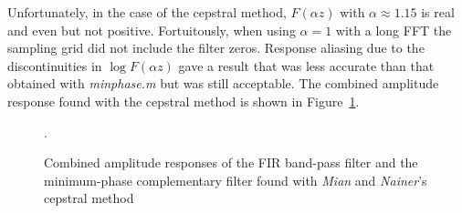 \documentclass[a4paper,twoside,10pt,english]{report}
\begin{document}
Unfortunately, in the case of the cepstral method, $F\left(\alpha z\right)$
with $\alpha \approx 1.15$ is real and even but not positive. Fortuitously, when
using $\alpha=1$ with a long FFT the sampling grid did not include the filter
zeros. Response aliasing due to the discontinuities in
$\log F\left(\alpha z\right)$ gave a result that was less accurate than that
obtained with \emph{minphase.m} but was still acceptable. The combined amplitude
response found with the cepstral method is shown in 
Figure~\ref{fig:minphase-cepstral-combined-response}.

\begin{figure}[!htbp]
\begin{center}
\scalebox{0.7}{}
\caption{Combined amplitude responses of the FIR band-pass filter and the
minimum-phase complementary filter found with \emph{Mian} and \emph{Nainer}'s 
cepstral method}
\label{fig:minphase-cepstral-combined-response}.
\end{center}
\end{figure}

\cleardoublepage{}
\end{document}
